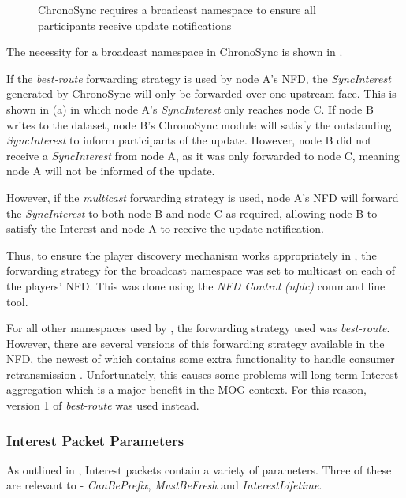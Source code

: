 \begin{figure}[H]
    \centering
    \caption{ChronoSync requires a broadcast namespace to ensure all participants receive update notifications}
    \label{fig:impl:disc-fs}
\end{figure}

The necessity for a broadcast namespace in ChronoSync is shown in . 

If the \textit{best-route} forwarding strategy is used by node A's NFD, the \textit{SyncInterest} generated by ChronoSync will only be forwarded over one upstream face. This is shown in  (a) in which node A's \textit{SyncInterest} only reaches node C. If node B writes to the dataset, node B's ChronoSync module will satisfy the outstanding \textit{SyncInterest} to inform participants of the update. However, node B did not receive a \textit{SyncInterest} from node A, as it was only forwarded to node C, meaning node A will not be informed of the update.

However, if the \textit{multicast} forwarding strategy is used, node A's NFD will forward the \textit{SyncInterest} to both node B and node C as required, allowing node B to satisfy the Interest and node A to receive the update notification. 

Thus, to ensure the player discovery mechanism works appropriately in \game{}, the forwarding strategy for the broadcast namespace was set to multicast on each of the players' NFD. This was done using the \textit{NFD Control (nfdc)} \cite{nfdc} command line tool.

For all other namespaces used by \game{}, the forwarding strategy used was \textit{best-route}. However, there are several versions of this forwarding strategy available in the NFD, the newest of which contains some extra functionality to handle consumer retransmission \cite{nfd-bestroute-v2}. Unfortunately, this causes some problems will long term Interest aggregation which is a major benefit in the MOG context. For this reason, version 1 of \textit{best-route} was used instead.

\subsubsection{Interest Packet Parameters}
As outlined in , Interest packets contain a variety of parameters. Three of these are relevant to \game{} - \textit{CanBePrefix}, \textit{MustBeFresh} and \textit{InterestLifetime}.

